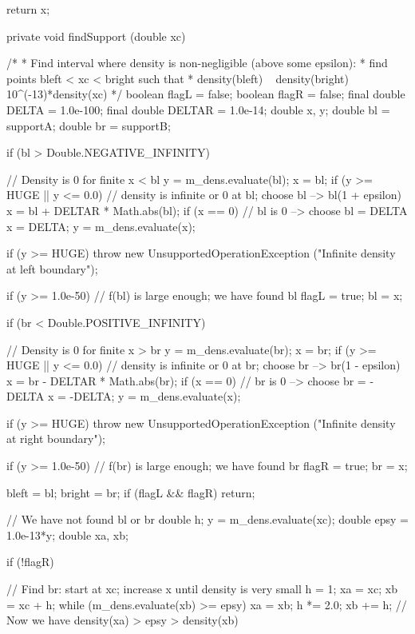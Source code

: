 \begin{hide}
\begin{code}
{      return x;
   }


   private void findSupport (double xc) {
      /*
       * Find interval where density is non-negligible (above some epsilon):
       * find points bleft < xc < bright such that
       *      density(bleft) ~ density(bright) ~ 10^(-13)*density(xc)
       */
      boolean flagL = false;
      boolean flagR = false;
      final double DELTA = 1.0e-100;
      final double DELTAR = 1.0e-14;
      double x, y;
      double bl = supportA;
      double br = supportB;

      if (bl > Double.NEGATIVE_INFINITY) {
         // Density is 0 for finite x < bl
         y = m_dens.evaluate(bl);
         x = bl;
         if (y >= HUGE || y <= 0.0) {
            // density is infinite or 0 at bl; choose bl --> bl(1 + epsilon)
            x = bl + DELTAR * Math.abs(bl);
            if (x == 0)
               // bl is 0 --> choose bl = DELTA
               x = DELTA;
            y = m_dens.evaluate(x);
         }

         if (y >= HUGE)
            throw new UnsupportedOperationException
            ("Infinite density at left boundary");

         if (y >= 1.0e-50) {
            // f(bl) is large enough; we have found bl
            flagL = true;
            bl = x;
         }
      }

      if (br < Double.POSITIVE_INFINITY) {
         // Density is 0 for finite x > br
         y = m_dens.evaluate(br);
         x = br;
         if (y >= HUGE || y <= 0.0) {
            // density is infinite or 0 at br; choose br --> br(1 - epsilon)
            x = br - DELTAR * Math.abs(br);
            if (x == 0)
               // br is 0 --> choose br = -DELTA
               x = -DELTA;
            y = m_dens.evaluate(x);
         }

         if (y >= HUGE)
            throw new UnsupportedOperationException
            ("Infinite density at right boundary");

         if (y >= 1.0e-50) {
            // f(br) is large enough; we have found br
            flagR = true;
            br = x;
         }
      }

      bleft = bl;
      bright = br;
      if (flagL && flagR)
         return;

      // We have not found bl or br
      double h;
      y = m_dens.evaluate(xc);
      double epsy = 1.0e-13*y;
      double xa, xb;


      if (!flagR) {
         // Find br: start at xc; increase x until density is very small
         h = 1;
         xa = xc;
         xb = xc + h;
         while (m_dens.evaluate(xb) >= epsy) {
            xa = xb;
            h *= 2.0;
            xb += h;
         }
         // Now we have density(xa) > epsy > density(xb)

}}
\end{code}
\end{hide}
